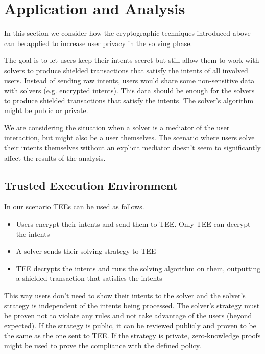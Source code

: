 \documentclass[final]{msc}
\begin{document}
\section{Application and Analysis}

In this section we consider how the cryptographic techniques introduced above can be applied to increase user privacy in the solving phase.

The goal is to let users keep their intents secret but still allow them to work with solvers to produce shielded transactions that satisfy the intents of all involved users. Instead of sending raw intents, users would share some non-sensitive data with solvers (e.g. encrypted intents). This data should be enough for the solvers to produce shielded transactions that satisfy the intents. The solver's algorithm might be public or private. 

We are considering the situation when a solver is a mediator of the user interaction, but might also be a user themselves. The scenario where users solve their intents themselves without an explicit mediator doesn't seem to significantly affect the results of the analysis.

\subsection{Trusted Execution Environment}

In our scenario TEEs can be used as follows.
\begin{itemize}
    \item Users encrypt their intents and send them to TEE. Only TEE can decrypt the intents
    \item A solver sends their solving strategy to TEE
    \item TEE decrypts the intents and runs the solving algorithm on them, outputting a shielded transaction that satisfies the intents
\end{itemize}

This way users don't need to show their intents to the solver and the solver's strategy is independent of the intents being processed. The solver's strategy must be proven not to violate any rules and not take advantage of the users (beyond expected). If the strategy is public, it can be reviewed publicly and proven to be the same as the one sent to TEE. If the strategy is private, zero-knowledge proofs might be used to prove the compliance with the defined policy.

\hfill
\end{document}
